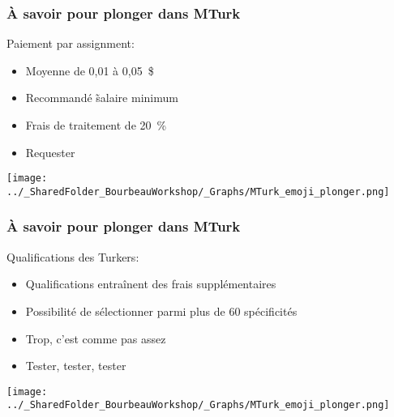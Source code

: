 \documentclass{beamer}
\begin{document}

    \begin{frame}
    
      \frametitle{À savoir pour plonger dans MTurk} \vspace{1cm}
      
      Paiement par assignment:
       \begin{itemize}
          \item{Moyenne de 0,01 à 0,05~\$}
          \item{Recommandé \~ salaire minimum}
          \item{Frais de traitement de 20~\%}
          \item{Requester}
        \end{itemize}
  
   \begin{flushright}
     	    \texttt{[image: ../\_SharedFolder\_BourbeauWorkshop/\_Graphs/MTurk\_emoji\_plonger.png]}
    \end{flushright} 
         
    \end{frame}  
    
    

    \begin{frame}
    
      \frametitle{À savoir pour plonger dans MTurk} \vspace{1cm}
      
      Qualifications des Turkers:
       \begin{itemize}
          \item{Qualifications entraînent des frais supplémentaires}
          \item{Possibilité de sélectionner parmi plus de 60 spécificités}
          \item{Trop, c'est comme pas assez}
          \item{Tester, tester, tester}
        \end{itemize}
   
   \begin{flushright}
     	    \texttt{[image: ../\_SharedFolder\_BourbeauWorkshop/\_Graphs/MTurk\_emoji\_plonger.png]}
    \end{flushright} 
         
    \end{frame}  
    
\end{document}
